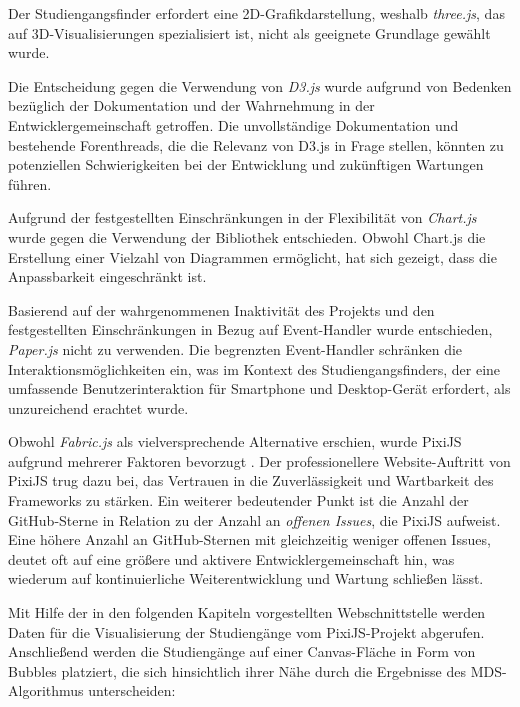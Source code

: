 Der Studiengangsfinder erfordert eine 2D-Grafikdarstellung, weshalb
\textit{three.js}, das auf 3D-Visualisierungen spezialisiert ist, nicht als
geeignete Grundlage gewählt wurde. \parencite{threejs_threejs_2023}

Die Entscheidung gegen die Verwendung von \textit{D3.js} wurde aufgrund
von Bedenken bezüglich der Dokumentation und der Wahrnehmung in der 
Entwicklergemeinschaft getroffen. Die unvollständige Dokumentation und
bestehende Forenthreads, die die Relevanz von D3.js in Frage stellen, könnten zu
potenziellen Schwierigkeiten bei der Entwicklung und zukünftigen Wartungen
führen. \parencite{bostock_d3js_2023}


Aufgrund der festgestellten Einschränkungen in der Flexibilität von
\textit{Chart.js} wurde gegen die Verwendung der Bibliothek entschieden. Obwohl
Chart.js die Erstellung einer Vielzahl von Diagrammen ermöglicht, hat sich
gezeigt, dass die Anpassbarkeit eingeschränkt ist. \parencite{etimberg_chartjs_2023}

Basierend auf der wahrgenommenen Inaktivität des Projekts und den festgestellten 
Einschränkungen in Bezug auf Event-Handler wurde entschieden, \textit{Paper.js}
nicht zu verwenden. \parencite{lehni_paperjs_2023} Die begrenzten Event-Handler schränken
die Interaktionsmöglichkeiten ein, was im Kontext des Studiengangsfinders, der
eine umfassende Benutzerinteraktion für Smartphone und Desktop-Gerät erfordert,
als unzureichend erachtet wurde. \parencite{etimberg_paperjs_2023}

Obwohl \textit{Fabric.js} als vielversprechende Alternative erschien, wurde
PixiJS aufgrund mehrerer Faktoren bevorzugt \parencite{zaytsev_fabricjs_2023}. Der
professionellere Website-Auftritt von PixiJS trug dazu bei, das Vertrauen in
die Zuverlässigkeit und Wartbarkeit des Frameworks zu stärken. Ein weiterer
bedeutender Punkt ist die Anzahl der GitHub-Sterne in Relation zu der Anzahl an
\textit{offenen Issues}, die PixiJS aufweist. Eine höhere Anzahl an
GitHub-Sternen mit gleichzeitig weniger offenen Issues, deutet oft auf eine
größere und aktivere Entwicklergemeinschaft hin, was wiederum auf
kontinuierliche Weiterentwicklung und Wartung schließen lässt.
\parencite{batista_github_2023}

Mit Hilfe der in den folgenden Kapiteln vorgestellten Webschnittstelle werden Daten für die Visualisierung der Studiengänge vom PixiJS-Projekt abgerufen. Anschließend werden die Studiengänge auf einer Canvas-Fläche in Form von Bubbles platziert, die sich hinsichtlich ihrer Nähe durch die Ergebnisse des MDS-Algorithmus unterscheiden:

